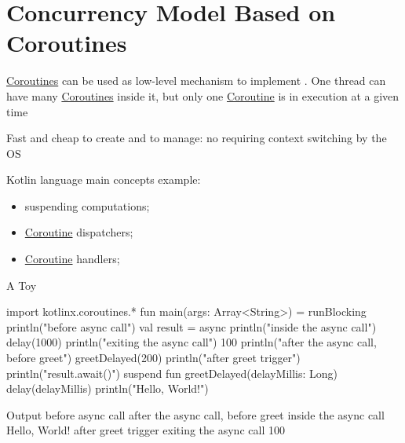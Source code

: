 \section{Concurrency Model Based on Coroutines}\label{sec:rs_concurrency_model_based_on_coroutines} %
\hyperref[sub:rs_co_routines]{Coroutines} can be used as low-level mechanism to implement .
One thread can have many \hyperref[sub:rs_co_routines]{Coroutines} inside it, but only one \hyperref[sub:rs_co_routines]{Coroutine} is in execution at a given time
\begin{note}
    Fast and cheap to create and to manage: no requiring context switching by the OS
\end{note}
Kotlin language main concepts example:
\begin{itemize}
    \item suspending computations;
    \item \hyperref[sub:rs_co_routines]{Coroutine} dispatchers;
    \item \hyperref[sub:rs_co_routines]{Coroutine} handlers;
\end{itemize}
\begin{example}{A Toy}{}
    \begin{codeblock}[Kotlin]{}
    import kotlinx.coroutines.*
    fun main(args: Array<String>) = runBlocking {
        println("before async call")
        val result = async {
            println("inside the async call")
            delay(1000)
            println("exiting the async call")
            100
        }
        println("after the async call, before greet")
        greetDelayed(200)
        println("after greet trigger")
        println("{result.await()}")
    }
    suspend fun greetDelayed(delayMillis: Long) {
        delay(delayMillis)
        println("Hello, World!")
    }
    \end{codeblock}
    \begin{codeblock}[txt]{Output}
    before async call
    after the async call, before greet
    inside the async call
    Hello, World!
    after greet trigger
    exiting the async call
    100
    \end{codeblock}
\end{example}
%
